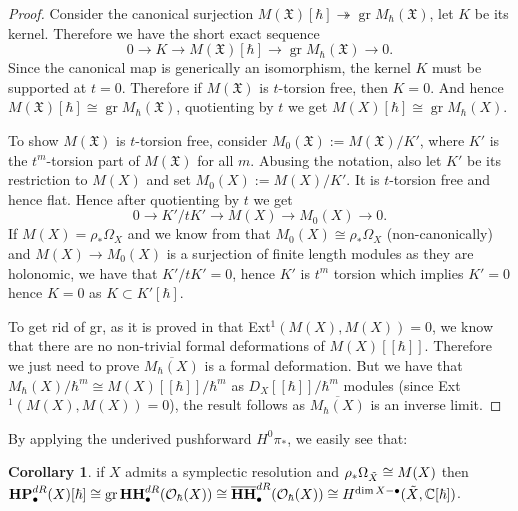 \documentclass[draft]{article}
\theoremstyle{definition}
\newtheorem{corollary}[theorem]{Corollary}
\DeclareMathOperator{\gr}{gr}
\DeclareMathOperator{\HH}{\mathbf{HH}}
\DeclareMathOperator{\HP}{\mathbf{HP}}
\newcommand{\doubleh}{[\![ \hbar ]\!]}
\newcommand{\OhX}{\mathcal{O}_\hbar(X)}
\newcommand{\MXh}{M(X)\doubleh}
\newcommand{\MhX}{M_\hbar(X)}
\begin{document}
\begin{proof}
Consider the canonical surjection $M(\mathfrak{X})[\hbar]\twoheadrightarrow \gr M_\hbar(\mathfrak{X})$, let $K$ be its kernel. Therefore we have the short exact sequence $$0\to K\to M(\mathfrak{X})[\hbar]\to \gr M_\hbar(\mathfrak{X})\to 0.$$ Since the canonical map is generically an isomorphism, the kernel $K$ must be supported at $t=0$. Therefore if $M(\mathfrak{X})$ is $t$-torsion free, then $K=0$. And hence $M(\mathfrak{X})[\hbar]\cong \gr M_\hbar(\mathfrak{X})$, quotienting by $t$ we get $M(X)[\hbar]\cong \gr M_\hbar(X).$

To show $M(\mathfrak{X})$ is $t$-torsion free, consider $M_0(\mathfrak{X}):=M(\mathfrak{X})/K'$, where $K'$ is the $t^m$-torsion part of $M(\mathfrak{X})$ for all $m$. Abusing the notation, also let $K'$ be its restriction to $M(X)$ and set $M_0(X):=M(X)/K'$. It is $t$-torsion free and hence flat. Hence after quotienting by $t$ we get $$0\to K'/tK'\to M(X)\to M_0(X)\to 0.$$ If $M(X)=\rho_*\Omega_{X}$ and we know from \cite[Corollary 3.6]{Poisson-de_Rham_homology_of_hypertoric_varieties_and_nilpotent_cones} that $M_0(X)\cong\rho_*\Omega_{X}$ (non-canonically) and $M(X)\to M_0(X)$ is a surjection of finite length modules as they are holonomic, we have that $K'/tK'=0$, hence $K'$ is $t^m$ torsion which implies $K'=0$ hence $K=0$ as $K\subset K'[\hbar].$

To get rid of gr, as it is proved in \cite{Poisson-de_Rham_homology_of_hypertoric_varieties_and_nilpotent_cones} that Ext$^1(M(X),M(X))=0$, we know that there are no non-trivial formal deformations of $M(X)\doubleh$. Therefore we just need to prove $\overline{\MhX}$ is a formal deformation. But we have that $\MhX/\hbar^m\cong \MXh/\hbar^m$ as $D_X\doubleh/\hbar^m$ modules (since Ext$^1(M(X),M(X))=0$), the result follows as $\overline{\MhX}$ is an inverse limit.
\end{proof}

By applying the underived pushforward $H^0\pi_*$, we easily see that:

\begin{corollary}
if $X$ admits a symplectic resolution and $\rho_*\Omega_{\Tilde{X}}\cong M(X)$ then $\HP^{dR}_\bullet(X)[\hbar] \cong\gr \HH^{dR}_\bullet(\OhX)\cong \overline{\HH}^{dR}_\bullet(\OhX)\cong H^{\dim X-\bullet}(\Tilde{X},\mathbb{C}[\hbar])$. 
\end{corollary}
\end{document}
